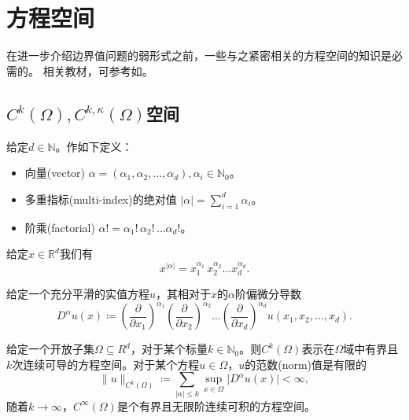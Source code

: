 \section{方程空间}
在进一步介绍边界值问题的弱形式之前，一些与之紧密相关的方程空间的知识是必需的。
相关教材，可参考如\cite{McLean:2000ta, Adams:2003wi, Tartar:2007vm, Mazya:2009vz, Mazya:2009wu}。

\subsection{\texorpdfstring{$C^{k}(\Omega),C^{k,\kappa}(\Omega)$}{CK}空间}

给定$d \in \mathbb{N}$。作如下定义：
\begin{itemize}
  \item 向量(vector) $\alpha = \left( \alpha_1, \alpha_2, \ldots, \alpha_d \right), \alpha_i \in \mathbb{N}_0$。
  \item 多重指标(multi-index)的绝对值 $\left| \alpha \right|=\sum_{i=1}^{d} \alpha_i$。
  \item 阶乘(factorial) $\alpha ! = \alpha_1! \, \alpha_2 ! \,  \ldots \alpha_d !$。
\end{itemize}

给定$x \in \mathbb{R}^d$我们有
\begin{equation*}
  x^{\left| \alpha \right|} = x_1^{\alpha_1} \, x_2^{\alpha_2} \ldots x_d^{\alpha_d}.
\end{equation*}

给定一个充分平滑的实值方程$u$，其相对于$x$的$\alpha$阶偏微分导数
\begin{equation*}
  D^{\alpha} u(x) \coloneqq \left( \frac{\partial }{\partial x_{1}} \right)^{\alpha_1} \left( \frac{\partial }{\partial x_{2}} \right)^{\alpha_2} \ldots \left( \frac{\partial }{\partial x_{d}} \right)^{\alpha_d} u \left( x_1, x_2, \ldots, x_d \right).
\end{equation*}

给定一个开放子集$\Omega \subseteq R^{d}$，对于某个标量$k \in \mathbb{N}_0$。则$C^{k}(\Omega)$表示在$\Omega$域中有界且$k$次连续可导的方程空间。对于某个方程$u \in \Omega$，$u$的范数(norm)值是有限的
\begin{equation*}
  \| u \|_{C^{k}(\Omega)} \coloneqq \sum_{\left| \alpha \right| \le k} \sup_{x \in \Omega} \big| D^{\alpha} u(x) \big| < \infty,
\end{equation*}
随着$k \rightarrow \infty$，$C^{\infty}(\Omega)$是个有界且无限阶连续可积的方程空间。

